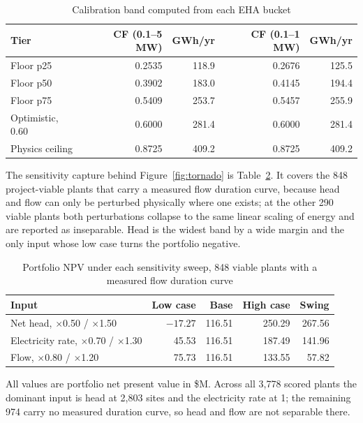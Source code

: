 \documentclass[12pt,letterpaper]{report}
\begin{document}
\begin{table}[htbp]
\centering
\caption{Calibration band computed from each EHA bucket}
\label{tab:band_both}
\footnotesize
\begin{tabular}{@{}lrrrr@{}}
\toprule
Tier & CF (0.1--5 MW) & GWh/yr & CF (0.1--1 MW) & GWh/yr \\
\midrule
Floor p25        & 0.2535 & 118.9 & 0.2676 & 125.5 \\
Floor p50        & 0.3902 & 183.0 & 0.4145 & 194.4 \\
Floor p75        & 0.5409 & 253.7 & 0.5457 & 255.9 \\
Optimistic, 0.60 & 0.6000 & 281.4 & 0.6000 & 281.4 \\
Physics ceiling  & 0.8725 & 409.2 & 0.8725 & 409.2 \\
\bottomrule
\end{tabular}
\end{table}

The sensitivity capture behind Figure~\ref{fig:tornado} is
Table~\ref{tab:sens_capture}. It covers the 848 project-viable plants that carry a
measured flow duration curve, because head and flow can only be perturbed
physically where one exists; at the other 290 viable plants both perturbations
collapse to the same linear scaling of energy and are reported as inseparable. Head
is the widest band by a wide margin and the only input whose low case turns the
portfolio negative.

\begin{table}[htbp]
\centering
\caption{Portfolio NPV under each sensitivity sweep, 848 viable plants with a
measured flow duration curve}
\label{tab:sens_capture}
\footnotesize
\begin{tabular}{@{}lrrrr@{}}
\toprule
Input & Low case & Base & High case & Swing \\
\midrule
Net head, $\times$0.50 / $\times$1.50         & $-17.27$ & 116.51 & 250.29 & 267.56 \\
Electricity rate, $\times$0.70 / $\times$1.30 & 45.53    & 116.51 & 187.49 & 141.96 \\
Flow, $\times$0.80 / $\times$1.20             & 75.73    & 116.51 & 133.55 & 57.82  \\
\bottomrule
\end{tabular}

\vspace{0.4em}
{\footnotesize All values are portfolio net present value in \$M. Across all 3,778
scored plants the dominant input is head at 2,803 sites and the electricity rate at
1; the remaining 974 carry no measured duration curve, so head and flow are not
separable there.}
\end{table}
\end{document}

